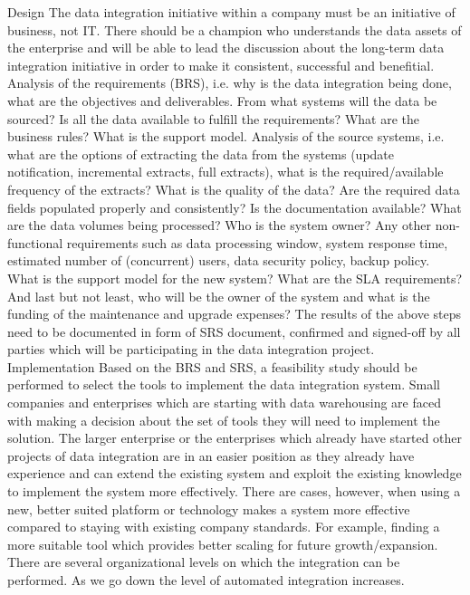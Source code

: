 \documentclass{article}
\begin{document}
Design
The data integration initiative within a company must be an initiative of business, not IT. There should be a champion who understands the data assets of the enterprise and will be able to lead the discussion about the long-term data integration initiative in order to make it consistent, successful and benefitial.
Analysis of the requirements (BRS), i.e. why is the data integration being done, what are the objectives and deliverables. From what systems will the data be sourced? Is all the data available to fulfill the requirements? What are the business rules? What is the support model.
Analysis of the source systems, i.e. what are the options of extracting the data from the systems (update notification, incremental extracts, full extracts), what is the required/available frequency of the extracts? What is the quality of the data? Are the required data fields populated properly and consistently? Is the documentation available? What are the data volumes being processed? Who is the system owner?
Any other non-functional requirements such as data processing window, system response time, estimated number of (concurrent) users, data security policy, backup policy.
What is the support model for the new system? What are the SLA requirements?
And last but not least, who will be the owner of the system and what is the funding of the maintenance and upgrade expenses?
The results of the above steps need to be documented in form of SRS document, confirmed and signed-off by all parties which will be participating in the data integration project.
Implementation
Based on the BRS and SRS, a feasibility study should be performed to select the tools to implement the data integration system. Small companies and enterprises which are starting with data warehousing are faced with making a decision about the set of tools they will need to implement the solution. The larger enterprise or the enterprises which already have started other projects of data integration are in an easier position as they already have experience and can extend the existing system and exploit the existing knowledge to implement the system more effectively. There are cases, however, when using a new, better suited platform or technology makes a system more effective compared to staying with existing company standards. For example, finding a more suitable tool which provides better scaling for future growth/expansion.
There are several organizational levels on which the integration can be performed. As we go down the level of automated integration increases.
\end{document}
